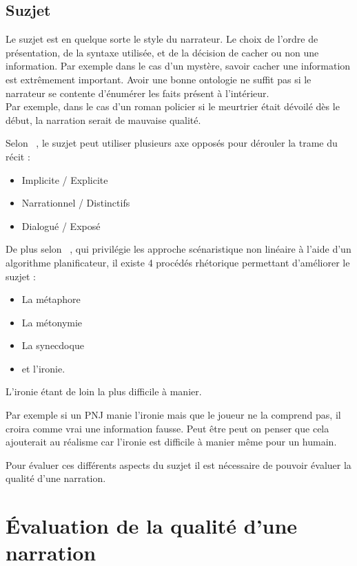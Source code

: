 \documentclass[asi]{picINSA}
\begin{document}
\subsection{Suzjet}

Le suzjet est en quelque sorte le style du narrateur. Le choix de l'ordre de présentation, de la syntaxe utilisée, et de la décision de cacher ou non une information. Par exemple dans le cas d'un mystère, savoir cacher une information est extrêmement important. Avoir une bonne ontologie ne suffit pas si le narrateur se contente d'énumérer les faits présent à l'intérieur. \\

Par exemple, dans le cas d'un roman policier si le meurtrier était dévoilé dès le début, la narration serait de mauvaise qualité.

Selon ~\cite{callaway2002narrative}, le suzjet peut utiliser plusieurs axe opposés pour dérouler la trame du récit :
\begin{itemize}
\item Implicite / Explicite
\item Narrationnel / Distinctifs
\item Dialogué / Exposé \\
\end{itemize}

De plus selon ~\cite{Ciarlini:2010:ERP:1658866.1658874}, qui privilégie les approche scénaristique non linéaire à l'aide d'un algorithme planificateur, il existe 4 procédés rhétorique permettant d'améliorer le suzjet :
\begin{itemize}
\item La métaphore
\item La métonymie
\item La synecdoque
\item et l'ironie.
\end{itemize}
L'ironie étant de loin la plus difficile à manier.

Par exemple si un PNJ manie l'ironie mais que le joueur ne la comprend pas, il croira comme vrai une information fausse. Peut être peut on penser que cela ajouterait au réalisme car l'ironie est difficile à manier même pour un humain.

Pour évaluer ces différents aspects du suzjet il est nécessaire de pouvoir évaluer la qualité d'une narration.

\section{Évaluation de la qualité d'une narration}
\end{document}
